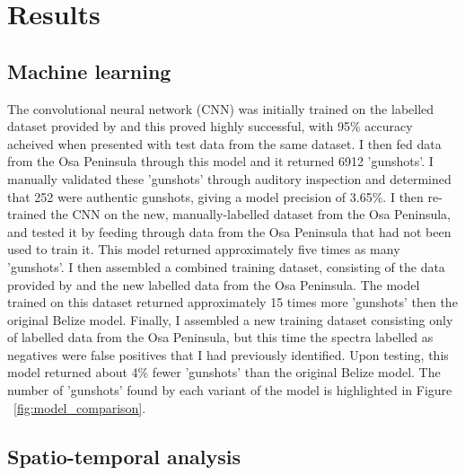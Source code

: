 
\chapter{Results} %

\label{Results} %

\section{Machine learning}

The convolutional neural network (CNN) was initially trained on the labelled dataset provided by \cite{Hill2018} and this proved highly successful, with 95\% accuracy acheived when presented with test data from the same dataset. I then fed data from the Osa Peninsula through this model and it returned 6912 'gunshots'. I manually validated these 'gunshots' through auditory inspection and determined that 252 were authentic gunshots, giving a model precision of 3.65\%. I then re-trained the CNN on the new, manually-labelled dataset from the Osa Peninsula, and tested it by feeding through data from the Osa Peninsula that had not been used to train it. This model returned approximately five times as many 'gunshots'. I then assembled a combined training dataset, consisting of the data provided by \cite{Hill2018} and the new labelled data from the Osa Peninsula. The model trained on this dataset returned approximately 15 times more 'gunshots' then the original Belize model. Finally, I assembled a new training dataset consisting only of labelled data from the Osa Peninsula, but this time the spectra labelled as negatives were false positives that I had previously identified. Upon testing, this model returned about 4\% fewer 'gunshots' than the original Belize model. The number of 'gunshots' found by each variant of the model is highlighted in Figure ~\ref{fig:model_comparison}.


\section{Spatio-temporal analysis}

